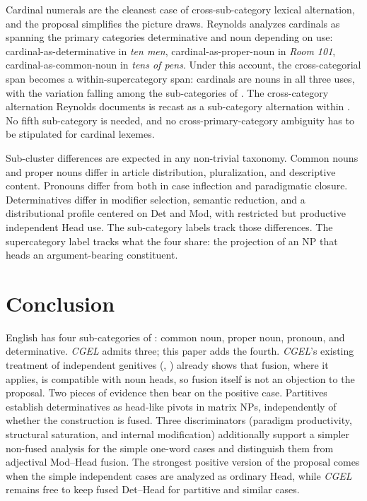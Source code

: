 \documentclass[12pt]{article}
\begin{document}
Cardinal numerals are the cleanest case of cross-sub-category lexical alternation, and the proposal simplifies the picture \citet{reynolds2026numerals} draws. Reynolds analyzes cardinals as spanning the primary categories determinative and noun depending on use: cardinal-as-determinative in \textit{ten men}, cardinal-as-proper-noun in \textit{Room 101}, cardinal-as-common-noun in \textit{tens of pens}. Under this account, the cross-categorial span becomes a within-supercategory span: cardinals are nouns in all three uses, with the variation falling among the sub-categories of . The cross-category alternation Reynolds documents is recast as a sub-category alternation within . No fifth sub-category is needed, and no cross-primary-category ambiguity has to be stipulated for cardinal lexemes.

Sub-cluster differences are expected in any non-trivial taxonomy. Common nouns and proper nouns differ in article distribution, pluralization, and descriptive content. Pronouns differ from both in case inflection and paradigmatic closure. Determinatives differ in modifier selection, semantic reduction, and a distributional profile centered on Det and Mod, with restricted but productive independent Head use. The sub-category labels track those differences. The supercategory label tracks what the four share: the projection of an NP that heads an argument-bearing constituent.

\section{Conclusion}\label{sec:conclusion}

English has four sub-categories of : common noun, proper noun, pronoun, and determinative. \textit{CGEL} admits three; this paper adds the fourth. \textit{CGEL}'s existing treatment of independent genitives (, ) already shows that fusion, where it applies, is compatible with noun heads, so fusion itself is not an objection to the proposal. Two pieces of evidence then bear on the positive case. Partitives establish determinatives as head-like pivots in matrix NPs, independently of whether the construction is fused. Three discriminators (paradigm productivity, structural saturation, and internal modification) additionally support a simpler non-fused analysis for the simple one-word cases and distinguish them from adjectival Mod--Head fusion. The strongest positive version of the proposal comes when the simple independent cases are analyzed as ordinary Head, while \textit{CGEL} remains free to keep fused Det--Head for partitive and similar cases.
\end{document}
